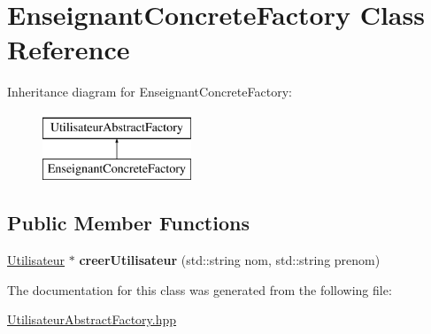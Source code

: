 \hypertarget{classEnseignantConcreteFactory}{\section{Enseignant\-Concrete\-Factory Class Reference}
\label{classEnseignantConcreteFactory}
}
Inheritance diagram for Enseignant\-Concrete\-Factory\-:\begin{figure}[H]
\begin{center}
\leavevmode
\includegraphics[height=2.000000cm]{classEnseignantConcreteFactory}
\end{center}
\end{figure}
\subsection*{Public Member Functions}
\begin{DoxyCompactItemize}
\item 
\hypertarget{classEnseignantConcreteFactory_a559eaa00e105df593115e0a7c34788cb}{\hyperlink{classUtilisateur}{Utilisateur} $\ast$ {\bfseries creer\-Utilisateur} (std\-::string nom, std\-::string prenom)}\label{classEnseignantConcreteFactory_a559eaa00e105df593115e0a7c34788cb}

\end{DoxyCompactItemize}


The documentation for this class was generated from the following file\-:\begin{DoxyCompactItemize}
\item 
\hyperlink{UtilisateurAbstractFactory_8hpp}{Utilisateur\-Abstract\-Factory.\-hpp}\end{DoxyCompactItemize}
